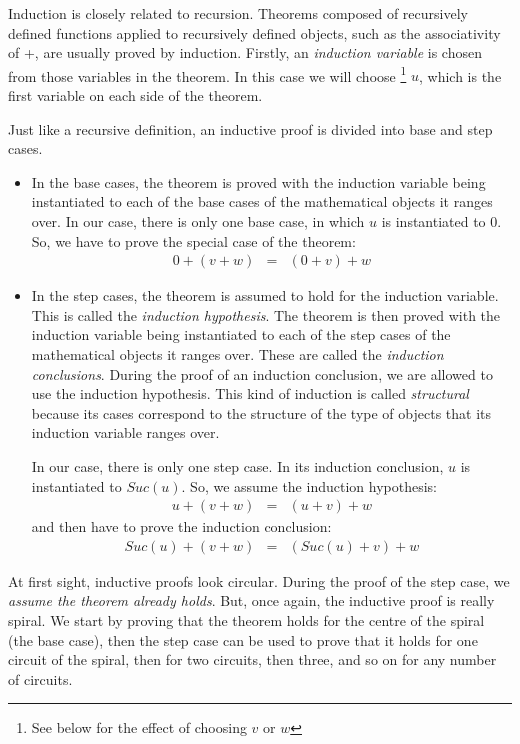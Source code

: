 \documentclass[twocolumn]{article}
\begin{document}
Induction is closely related to recursion. Theorems composed of recursively
defined functions applied to recursively defined objects, such as the
associativity of +, are usually proved by induction.  Firstly, an {\em induction
  variable} is chosen from those variables in the theorem.  In this case we will
choose \footnote{See below for the effect of choosing $v$ or $w$} $u$, which is
the first variable on each side of the theorem.

Just like a recursive definition, an inductive proof is divided into base and
step cases.
\begin{itemize}

\item In the base cases, the theorem is proved with the induction variable being
  instantiated to each of the base cases of the mathematical objects it ranges over. In
  our case, there is only one base case, in which $u$ is instantiated to
  $0$. So, we have to prove the special case of the theorem:
\begin{eqnarray*}
 0+(v+w) & = & (0+v)+w 
\end{eqnarray*}

\item In the step cases, the theorem is assumed to hold for the induction
  variable. This is called the {\em induction hypothesis}. The theorem is then
  proved with the induction variable being instantiated to each of the step cases of the
  mathematical objects it ranges over. These are called the {\em induction
    conclusions}. During the proof of an induction conclusion, we are allowed to
  use the induction hypothesis. This kind of induction is called {\em
    structural} because its cases correspond to the structure of the type of
  objects that its induction variable ranges over.  

  In our case, there is only one step case. In its induction conclusion, $u$ is
  instantiated to $Suc(u)$. So, we assume the induction hypothesis:
\begin{eqnarray}
 u+(v+w) & = & (u+v)+w \label{ih}
\end{eqnarray}
and then have to prove the induction conclusion:
\begin{eqnarray*}
 Suc(u)+(v+w) & = & (Suc(u)+v)+w
\end{eqnarray*}

\end{itemize}

 At first sight, inductive proofs look circular. During the proof of the step
case, we {\em assume the theorem already holds}. But, once again, the
inductive proof is really spiral. We start by proving that the theorem holds for
the centre of the spiral (the base case), then the step case can be used to
prove that it holds for one circuit of the spiral, then for two circuits, then
three, and so on for any number of circuits. 
\end{document}
